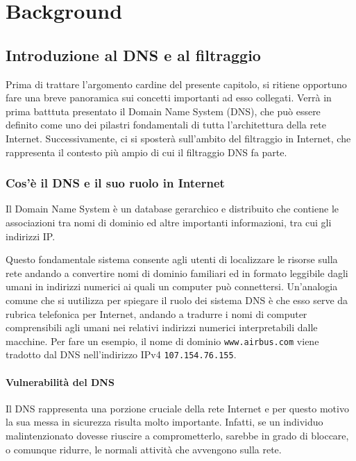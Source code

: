 \chapter{Background}

\section{Introduzione al DNS e al filtraggio}
Prima di trattare l'argomento cardine del presente capitolo, si ritiene opportuno fare una breve panoramica sui concetti importanti ad esso collegati. Verrà in prima batttuta presentato il Domain Name System (DNS), che può essere definito come uno dei pilastri fondamentali di tutta l'architettura della rete Internet. Successivamente, ci si sposterà sull'ambito del filtraggio in Internet, che rappresenta il contesto più ampio di cui il filtraggio DNS fa parte.

\subsection{Cos'è il DNS e il suo ruolo in Internet}
Il Domain Name System è un database gerarchico e distribuito che contiene le associazioni tra nomi di dominio ed altre importanti informazioni, tra cui gli indirizzi IP.

Questo fondamentale sistema consente agli utenti di localizzare le risorse sulla rete andando a convertire nomi di dominio familiari ed in formato leggibile dagli umani in indirizzi numerici ai quali un computer può connettersi. Un'analogia comune che si uutilizza per spiegare il ruolo dei sistema DNS è che esso serve da rubrica telefonica per Internet, andando a tradurre i nomi di computer comprensibili agli umani nei relativi indirizzi numerici interpretabili dalle macchine. Per fare un esempio, il nome di dominio \texttt{www.airbus.com} viene tradotto dal DNS nell'indirizzo IPv4 \texttt{107.154.76.155}.

\subsubsection{Vulnerabilità del DNS}
Il DNS rappresenta una porzione cruciale della rete Internet e per questo motivo la sua messa in sicurezza risulta molto importante. Infatti, se un individuo malintenzionato dovesse riuscire a comprometterlo, sarebbe in grado di bloccare, o comunque ridurre, le normali attività che avvengono sulla rete.

